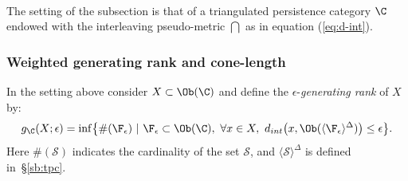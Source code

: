 \

The setting of the subsection is that of a triangulated persistence category $\C$ endowed with the interleaving pseudo-metric 
$\dint$ as in equation (\ref{eq:d-int}). 
%
%
%
%
%
%

\subsubsection{Weighted generating rank and
  cone-length} \label{subsec:wconel} In the setting above consider
$X\subset \Ob(\C)$ and define the $\epsilon$-{\em generating rank}
of $X$ by:
\begin{equation}\label{eq:no-of-gen}
  g_{\C}(X; \epsilon) =
  \inf \bigl\{  \# (\F_{\epsilon})\
  |\  \F_{\epsilon}\subset \Ob (\C)   ,
  \   \forall x\in X, \
  d_{int}\bigl(x, \Ob(\langle\F_{\epsilon}\rangle ^{\Delta})\bigr)
  \leq \epsilon \bigr\}.
\end{equation} 
Here $\# (\mathcal{S})$ indicates the cardinality of the set
$\mathcal{S}$, and $\langle \mathcal{S} \rangle ^{\Delta}$ is defined
in~\S\ref{sb:tpc}.

